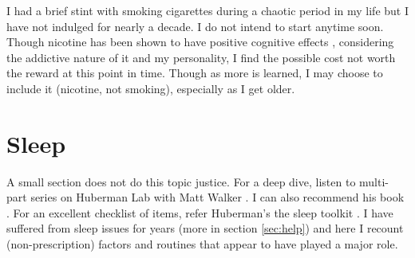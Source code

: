 \documentclass[10pt,twocolumn]{extarticle}
\begin{document}
I had a brief stint with smoking cigarettes during a chaotic period in my life but I have not indulged for nearly a decade. I do not intend to start anytime soon. Though nicotine has been shown to have positive cognitive effects \cite{rezvani2001cognitive,youtube_nicotine_huberman}, considering the addictive nature of it and my personality, I find the possible cost not worth the reward at this point in time. Though as more is learned, I may choose to include it (nicotine, not smoking), especially as I get older. 

\section{Sleep}
\label{sec:sleep}
A small section does not do this topic justice. For a deep dive, listen to multi-part series on Huberman Lab with Matt Walker \cite{huberman_walker_2024}. I can also recommend his book \cite{walker2017we}. For an excellent checklist of items, refer Huberman's the sleep toolkit \cite{huberman_toolkit_for_sleep}. I have suffered from sleep issues for years (more in section \ref{sec:help}) and here I recount (non-prescription) factors and routines that appear to have played a major role.
\end{document}
